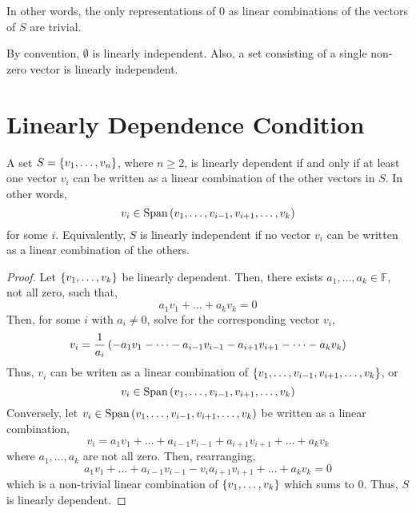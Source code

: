 \documentclass[letterpaper,12pt]{article}
\begin{document}
In other words, the only representations of $0$ as linear combinations of the vectors of $S$ are trivial.

\begin{example}
By convention, $\emptyset$ is linearly independent. Also, a set consisting of a single non-zero vector is linearly independent.
\end{example}

\section*{Linearly Dependence Condition}
\begin{theorem}
A set $S = \left\{ v_1, \dots, v_n \right\}$, where $n \geq 2$, is linearly dependent if and only if at least one vector $v_i$ can be written as a linear combination of the other vectors in $S$. In other words,
\begin{equation*}
    v_i \in \text{Span}\left(v_1, \dots, v_{i-1}, v_{i+1}, \dots, v_k \right)
\end{equation*}
for some $i$. Equivalently, $S$ is linearly independent if no vector $v_i$ can be written as a linear combination of the others.
\end{theorem}

\begin{proof}
Let $\left\{ v_1, \dots, v_k \right\}$ be linearly dependent. Then, there exists $a_1, \dots, a_k \in \mathbb{F}$, not all zero, such that,
\begin{equation*}
    a_1 v_1 + \dots + a_k v_k = 0
\end{equation*}
Then, for some $i$ with $a_i \neq 0$, solve for the corresponding vector $v_i$,
\begin{equation*}
    v_i = \frac{1}{a_i}\left( -a_1 v_1 - \dots - a_{i-1} v_{i-1} - a_{i+1} v_{i+1} - \dots - a_k v_k \right)
\end{equation*}
Thus, $v_i$ can be writen as a linear combination of $\left\{ v_1, \dots, v_{i-1}, v_{i+1}, \dots, v_k \right\}$, or
\begin{equation*}
    v_i \in \text{Span}\left(v_1, \dots, v_{i-1}, v_{i+1}, \dots, v_k \right)
\end{equation*}
Conversely, let $v_i \in \text{Span}\left(v_1, \dots, v_{i-1}, v_{i+1}, \dots, v_k \right)$ be written as a linear combination,
\begin{equation*}
    v_i = a_1 v_1 + \dots + a_{i-1} v_{i-1} + a_{i+1} v_{i+1} + \dots + a_k v_k
\end{equation*}
where $a_1, \dots, a_k$ are not all zero. Then, rearranging,
\begin{equation*}
    a_1 v_1 + \dots + a_{i-1} v_{i-1} - v_i a_{i+1} v_{i+1} + \dots + a_k v_k = 0
\end{equation*}
which is a non-trivial linear combination of $\left\{ v_1, \dots, v_k \right\}$ which sums to 0. Thus, $S$ is linearly dependent.
\end{proof}
\end{document}
